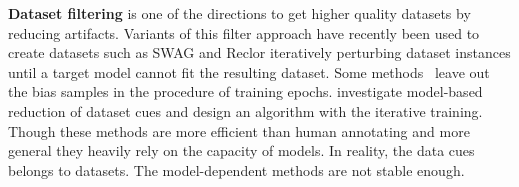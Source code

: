 \textbf{Dataset filtering} is one of the directions to get higher quality datasets by reducing artifacts. 
Variants of this filter approach have recently
been used to create datasets such as SWAG and Reclor 
iteratively perturbing dataset instances until a target 
model cannot fit the resulting dataset. Some methods~\cite{yaghoobzadeh2019robust} 
leave out the bias samples in the procedure of training epochs. \citealp{bras2020adversarial} 
investigate model-based reduction of dataset cues and design an algorithm with the iterative training. 
Though these methods are more efficient than human annotating and more general 
they heavily rely on the capacity of models. In reality, the data cues belongs to datasets. The 
model-dependent methods are not stable enough.







